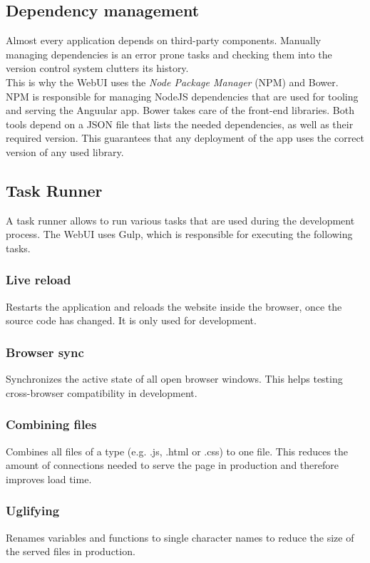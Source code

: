 \subsection{Dependency management}
Almost every application depends on third-party components. Manually managing dependencies is an error prone tasks and checking them into the version control system clutters its history.\\
This is why the WebUI uses the \textit{Node Package Manager} (NPM) and Bower. NPM is responsible for managing NodeJS dependencies that are used for tooling and serving the Anguular app. Bower takes care of the front-end libraries. Both tools depend on a JSON file that lists the needed dependencies, as well as their required version. This guarantees that any deployment of the app uses the correct version of any used library.

\subsection{Task Runner}
A task runner allows to run various tasks that are used during the development process. The WebUI uses Gulp, which is responsible for executing the following tasks.

\subsubsection{Live reload} Restarts the application and reloads the website inside the browser, once the source code has changed. It is only used for development.

\subsubsection{Browser sync} Synchronizes the active state of all open browser windows. This helps testing cross-browser compatibility in development.

\subsubsection{Combining files} Combines all files of a type (e.g. .js, .html or .css) to one file. This reduces the amount of connections needed to serve the page in production and therefore improves load time.

\subsubsection{Uglifying} Renames variables and functions to single character names to reduce the size of the served files in production.

